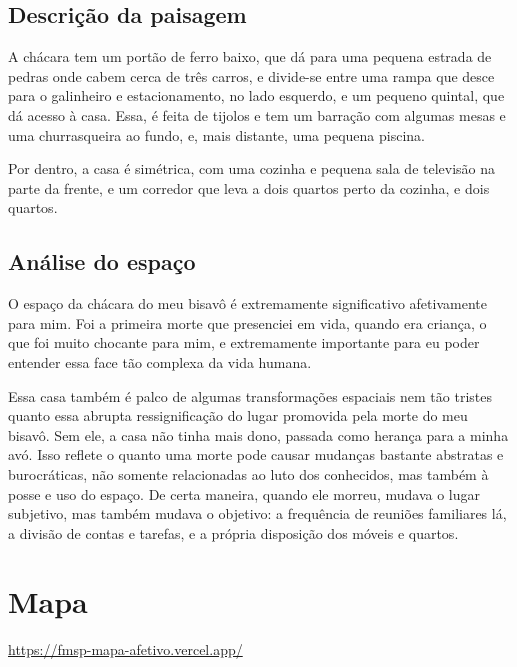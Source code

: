\documentclass[12pt]{article}
\begin{document}
\subsection{Descrição da paisagem}
A chácara tem um portão de ferro baixo, que dá para uma pequena estrada de pedras onde cabem cerca de três carros, e divide-se entre uma rampa que desce para o galinheiro e estacionamento, no lado esquerdo, e um pequeno quintal, que dá acesso à casa. Essa, é feita de tijolos e tem um barração com algumas mesas e uma churrasqueira ao fundo, e, mais distante, uma pequena piscina. 

Por dentro, a casa é simétrica, com uma cozinha e pequena sala de televisão na parte da frente, e um corredor que leva a dois quartos perto da cozinha, e dois quartos.
\subsection{Análise do espaço}
O espaço da chácara do meu bisavô é extremamente significativo afetivamente para mim. Foi a primeira morte que presenciei em vida, quando era criança, o que foi muito chocante para mim, e extremamente importante para eu poder entender essa face tão complexa da vida humana.

Essa casa também é palco de algumas transformações espaciais nem tão tristes quanto essa abrupta ressignificação do lugar promovida pela morte do meu bisavô. Sem ele, a casa não tinha mais dono, passada como herança para a minha avó. Isso reflete o quanto uma morte pode causar mudanças bastante abstratas e burocráticas, não somente relacionadas ao luto dos conhecidos, mas também à posse e uso do espaço. De certa maneira, quando ele morreu, mudava o lugar subjetivo, mas também mudava o objetivo: a frequência de reuniões familiares lá, a divisão de contas e tarefas, e a própria disposição dos móveis e quartos.

\section{Mapa}
\url{https://fmsp-mapa-afetivo.vercel.app/}
\end{document}
